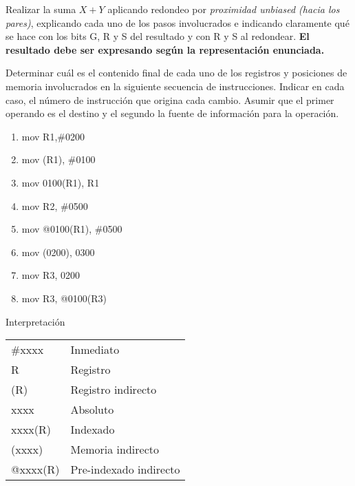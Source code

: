 \documentclass[12pt,a4paper]{article}
\begin{document}
Realizar la suma $X + Y$ aplicando redondeo por \textit{proximidad unbiased (hacia los pares)}, explicando cada uno de los pasos involucrados e indicando claramente qué se hace con los bits G, R y S del resultado y con R y S al redondear. \textbf{El resultado debe ser expresando según la representación enunciada.}



 Determinar cuál es el contenido final de cada uno de los registros y posiciones de memoria involucrados en la siguiente secuencia de instrucciones. Indicar en cada caso, el número de instrucción que origina cada cambio. Asumir que el primer operando es el destino y el segundo la fuente de información para la operación.
\begin{center}
	\begin{minipage}{0.4\textwidth}
		\begin{enumerate}[(1)]
			\itemsep -5pt
			\item mov R1,\#0200
			\item mov (R1), \#0100
			\item mov 0100(R1), R1
			\item mov R2, \#0500
			\item mov @0100(R1), \#0500
			\item mov (0200), 0300
			\item mov R3, 0200
			\item mov R3, @0100(R3)
		\end{enumerate}
	\end{minipage}
	\begin{minipage}{0.4\textwidth}
		Interpretación
		\begin{tabular}{ll}
			\#xxxx   & Inmediato\\
			R       & Registro \\
			(R)     & Registro indirecto\\
			xxxx    & Absoluto \\
			xxxx(R) & Indexado \\
			(xxxx)  & Memoria indirecto\\
			@xxxx(R) & Pre-indexado indirecto
		\end{tabular}
	\end{minipage}
\end{center}
\end{document}
